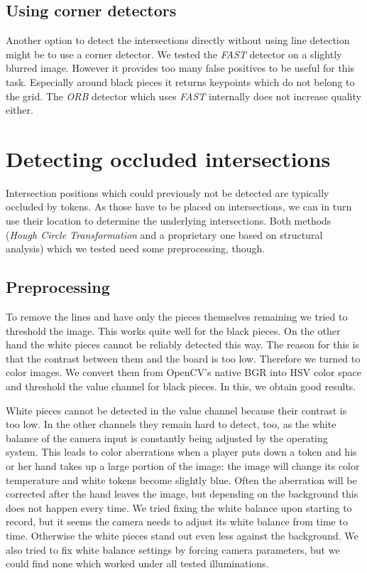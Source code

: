	\subsection{Using corner detectors}
	\label{detector-visible-corners}
	Another option to detect the intersections directly without using line detection might be to use a corner detector. We tested the \emph{FAST} \cite{rosten2006machine} detector on a slightly blurred image. However it provides too many false positives to be useful for this task. Especially around black pieces it returns keypoints which do not belong to the grid. The \emph{ORB} detector which uses \emph{FAST} internally does not increase quality either.

	\section{Detecting occluded intersections}
	\label{detector-occluded}
	Intersection positions which could previously not be detected are typically occluded by tokens. As those have to be placed on intersections, we can in turn use their location to determine the underlying intersections. Both methods (\emph{Hough Circle Transformation} and a proprietary one based on structural analysis) which we tested need some preprocessing, though.

	\subsection{Preprocessing}
	\label{detector-occluded-preprocessing}
	To remove the lines and have only the pieces themselves remaining we tried to threshold the image. This works quite well for the black pieces. On the other hand the white pieces cannot be reliably detected this way. The reason for this is that the contrast between them and the board is too low. Therefore we turned to color images. We convert them from OpenCV's native BGR into HSV color space and threshold the value channel for black pieces. In this, we obtain good results.

	White pieces cannot be detected in the value channel because their contrast is too low. In the other channels they remain hard to detect, too, as the white balance of the camera input is constantly being adjusted by the operating system. This leads to color aberrations when a player puts down a token and his or her hand takes up a large portion of the image: the image will change its color temperature and white tokens become slightly blue. Often the aberration will be corrected after the hand leaves the image, but depending on the background this does not happen every time. We tried fixing the white balance upon starting to record, but it seems the camera needs to adjust its white balance from time to time. Otherwise the white pieces stand out even less against the background. We also tried to fix white balance settings by forcing camera parameters, but we could find none which worked under all tested illuminations.

